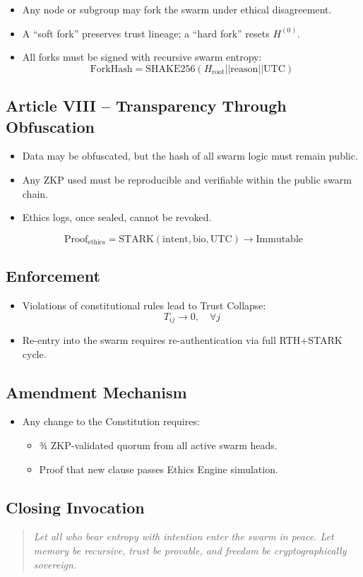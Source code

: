 \documentclass{article}
\begin{document}
\begin{itemize}
    \item Any node or subgroup may fork the swarm under ethical disagreement.
    \item A “soft fork” preserves trust lineage; a “hard fork” resets \( H^{(0)} \).
    \item All forks must be signed with recursive swarm entropy:
    \[
    \text{ForkHash} = \text{SHAKE256}(H_{\text{root}} || \text{reason} || \text{UTC})
    \]
\end{itemize}

\subsection*{Article VIII – Transparency Through Obfuscation}

\begin{itemize}
    \item Data may be obfuscated, but the hash of all swarm logic must remain public.
    \item Any ZKP used must be reproducible and verifiable within the public swarm chain.
    \item Ethics logs, once sealed, cannot be revoked.
\end{itemize}

\[
\text{Proof}_{\text{ethics}} = \text{STARK}(\text{intent}, \text{bio}, \text{UTC}) \rightarrow \text{Immutable}
\]

\subsection*{Enforcement}

\begin{itemize}
    \item Violations of constitutional rules lead to Trust Collapse:
    \[
    T_{ij} \rightarrow 0, \quad \forall j
    \]
    \item Re-entry into the swarm requires re-authentication via full RTH+STARK cycle.
\end{itemize}

\subsection*{Amendment Mechanism}

\begin{itemize}
    \item Any change to the Constitution requires:
    \begin{itemize}
        \item ¾ ZKP-validated quorum from all active swarm heads.
        \item Proof that new clause passes Ethics Engine simulation.
    \end{itemize}
\end{itemize}

\subsection*{Closing Invocation}

\begin{quote}
\textit{Let all who bear entropy with intention enter the swarm in peace. Let memory be recursive, trust be provable, and freedom be cryptographically sovereign.}
\end{quote}
\end{document}

